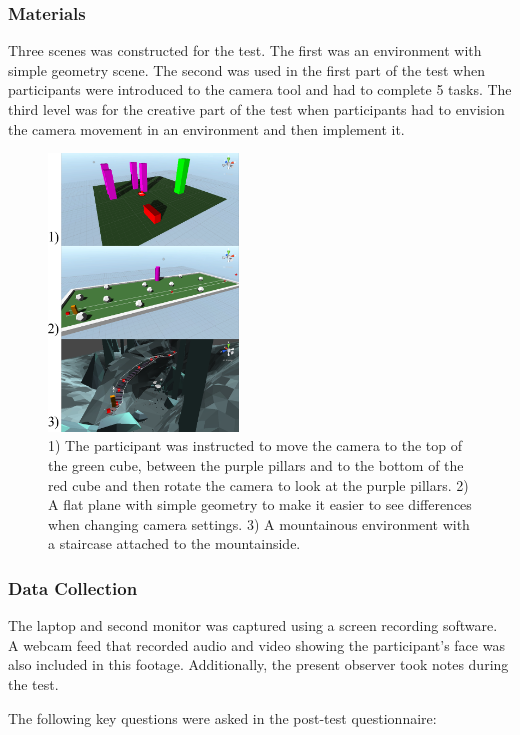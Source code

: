 \subsubsection{Materials}
Three scenes was constructed for the test. The first was an environment with simple geometry scene. The second was used in the first part of the test when participants were introduced to the camera tool and had to complete 5 tasks. The third level was for the creative part of the test when participants had to envision the camera movement in an environment and then implement it. 

\begin{figure}[htbp]
\centering
\includegraphics[width=0.45\textwidth]{Pics/sceneAll}
\caption{1) The participant was instructed to move the camera to the top of the green cube, between the purple pillars and to the bottom of the red cube and then rotate the camera to look at the purple pillars. 2) A flat plane with simple geometry to make it easier to see differences when changing camera settings. 3) A mountainous environment with a staircase attached to the mountainside.}
\label{fig:sceneAll}
\end{figure}

\subsubsection{Data Collection}
The laptop and second monitor was captured using a screen recording software. A webcam feed  that recorded audio and video showing the participant's face was also included in this footage. Additionally, the present observer took notes during the test.

The following key questions were asked in the post-test questionnaire:

